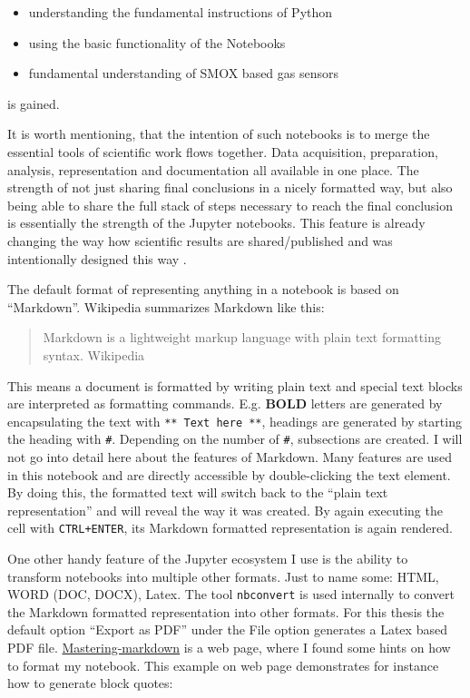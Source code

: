\documentclass[11pt]{article}
\providecommand{\tightlist}{%
      \setlength{\itemsep}{0pt}\setlength{\parskip}{0pt}}
\begin{document}
\begin{itemize}
\tightlist
\item
  understanding the fundamental instructions of Python
\item
  using the basic functionality of the Notebooks
\item
  fundamental understanding of SMOX based gas sensors
\end{itemize}

is gained.

It is worth mentioning, that the intention of such notebooks is to merge
the essential tools of scientific work flows together. Data acquisition,
preparation, analysis, representation and documentation all available in
one place. The strength of not just sharing final conclusions in a
nicely formatted way, but also being able to share the full stack of
steps necessary to reach the final conclusion is essentially the
strength of the Jupyter notebooks. This feature is already changing the
way how scientific results are shared/published and was intentionally
designed this way \cite{Randles2017}.

The default format of representing anything in a notebook is based on
``Markdown''. Wikipedia summarizes Markdown like this:

\begin{quote}
Markdown is a lightweight markup language with plain text formatting
syntax. Wikipedia
\end{quote}

This means a document is formatted by writing plain text and special
text blocks are interpreted as formatting commands. E.g. \textbf{BOLD}
letters are generated by encapsulating the text with
\texttt{**\ Text\ here\ **}, headings are generated by starting the
heading with \texttt{\#}. Depending on the number of \texttt{\#},
subsections are created. I will not go into detail here about the
features of Markdown. Many features are used in this notebook and are
directly accessible by double-clicking the text element. By doing this,
the formatted text will switch back to the ``plain text representation''
and will reveal the way it was created. By again executing the cell with
\texttt{CTRL+ENTER}, its Markdown formatted representation is again
rendered.

One other handy feature of the Jupyter ecosystem I use is the ability to
transform notebooks into multiple other formats. Just to name some:
HTML, WORD (DOC, DOCX), Latex. The tool \texttt{nbconvert} is used
internally to convert the Markdown formatted representation into other
formats. For this thesis the default option ``Export as PDF'' under the
File option generates a Latex based PDF file.
\href{https://guides.github.com/features/mastering-markdown/}{Mastering-markdown}
is a web page, where I found some hints on how to format my notebook.
This example on web page demonstrates for instance how to generate block
quotes:
\end{document}
